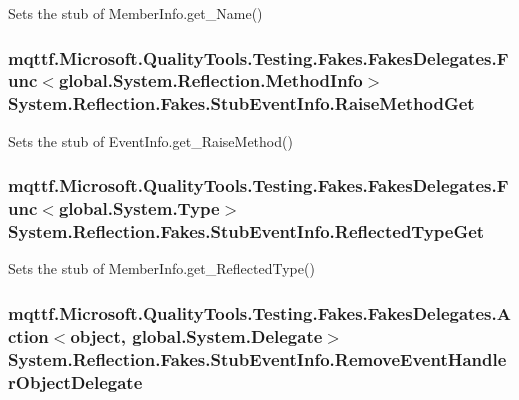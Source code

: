 Sets the stub of Member\-Info.\-get\-\_\-\-Name()

\hypertarget{class_system_1_1_reflection_1_1_fakes_1_1_stub_event_info_aeb5c39bffaf96344dee43bf7e87e263c}{
\subsubsection[{Raise\-Method\-Get}]{\setlength{\rightskip}{0pt plus 5cm}mqttf.\-Microsoft.\-Quality\-Tools.\-Testing.\-Fakes.\-Fakes\-Delegates.\-Func$<$global.\-System.\-Reflection.\-Method\-Info$>$ System.\-Reflection.\-Fakes.\-Stub\-Event\-Info.\-Raise\-Method\-Get}}\label{class_system_1_1_reflection_1_1_fakes_1_1_stub_event_info_aeb5c39bffaf96344dee43bf7e87e263c}


Sets the stub of Event\-Info.\-get\-\_\-\-Raise\-Method()

\hypertarget{class_system_1_1_reflection_1_1_fakes_1_1_stub_event_info_adfc08de91ed88826ba9bb5324ecf908c}{
\subsubsection[{Reflected\-Type\-Get}]{\setlength{\rightskip}{0pt plus 5cm}mqttf.\-Microsoft.\-Quality\-Tools.\-Testing.\-Fakes.\-Fakes\-Delegates.\-Func$<$global.\-System.\-Type$>$ System.\-Reflection.\-Fakes.\-Stub\-Event\-Info.\-Reflected\-Type\-Get}}\label{class_system_1_1_reflection_1_1_fakes_1_1_stub_event_info_adfc08de91ed88826ba9bb5324ecf908c}


Sets the stub of Member\-Info.\-get\-\_\-\-Reflected\-Type()

\hypertarget{class_system_1_1_reflection_1_1_fakes_1_1_stub_event_info_ad623474ee80ce5b142481981142c6bab}{
\subsubsection[{Remove\-Event\-Handler\-Object\-Delegate}]{\setlength{\rightskip}{0pt plus 5cm}mqttf.\-Microsoft.\-Quality\-Tools.\-Testing.\-Fakes.\-Fakes\-Delegates.\-Action$<$object, global.\-System.\-Delegate$>$ System.\-Reflection.\-Fakes.\-Stub\-Event\-Info.\-Remove\-Event\-Handler\-Object\-Delegate}}\label{class_system_1_1_reflection_1_1_fakes_1_1_stub_event_info_ad623474ee80ce5b142481981142c6bab}


